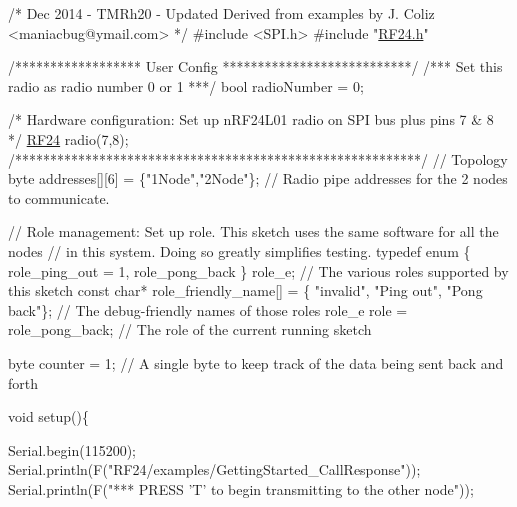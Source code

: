 \begin{DoxyCodeInclude}
\textcolor{comment}{/*}
\textcolor{comment}{   Dec 2014 - TMRh20 - Updated}
\textcolor{comment}{   Derived from examples by J. Coliz <maniacbug@ymail.com>}
\textcolor{comment}{*/}
\textcolor{preprocessor}{#include <SPI.h>}
\textcolor{preprocessor}{#include "\hyperlink{RF24_8h}{RF24.h}"}

\textcolor{comment}{/****************** User Config ***************************/}
\textcolor{comment}{/***      Set this radio as radio number 0 or 1         ***/}
\textcolor{keywordtype}{bool} radioNumber = 0;

\textcolor{comment}{/* Hardware configuration: Set up nRF24L01 radio on SPI bus plus pins 7 & 8 */}
\hyperlink{classRF24}{RF24} radio(7,8);
\textcolor{comment}{/**********************************************************/}
                                                                           \textcolor{comment}{// Topology}
byte addresses[][6] = \{\textcolor{stringliteral}{"1Node"},\textcolor{stringliteral}{"2Node"}\};              \textcolor{comment}{// Radio pipe addresses for the 2 nodes to
       communicate.}

\textcolor{comment}{// Role management: Set up role.  This sketch uses the same software for all the nodes}
\textcolor{comment}{// in this system.  Doing so greatly simplifies testing.  }
\textcolor{keyword}{typedef} \textcolor{keyword}{enum} \{ role\_ping\_out = 1, role\_pong\_back \} role\_e;                 \textcolor{comment}{// The various roles supported
       by this sketch}
\textcolor{keyword}{const} \textcolor{keywordtype}{char}* role\_friendly\_name[] = \{ \textcolor{stringliteral}{"invalid"}, \textcolor{stringliteral}{"Ping out"}, \textcolor{stringliteral}{"Pong back"}\};  \textcolor{comment}{// The debug-friendly names of
       those roles}
role\_e role = role\_pong\_back;                                              \textcolor{comment}{// The role of the current
       running sketch}

byte counter = 1;                                                          \textcolor{comment}{// A single byte to keep track
       of the data being sent back and forth}


\textcolor{keywordtype}{void} setup()\{

  Serial.begin(115200);
  Serial.println(F(\textcolor{stringliteral}{"RF24/examples/GettingStarted\_CallResponse"}));
  Serial.println(F(\textcolor{stringliteral}{"*** PRESS 'T' to begin transmitting to the other node"}));
 

\end{DoxyCodeInclude}
